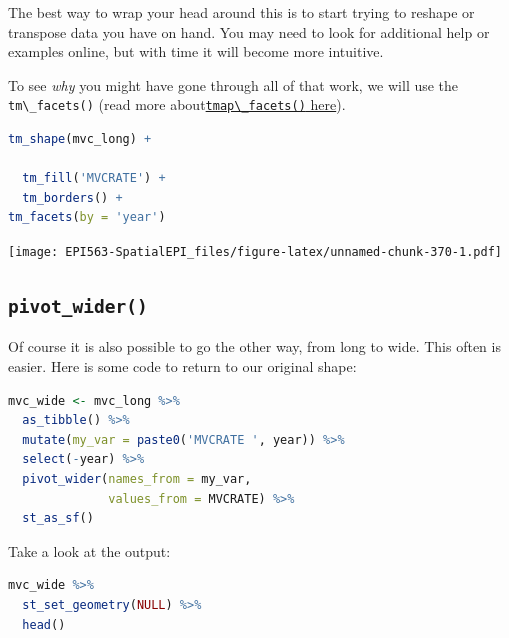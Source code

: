 \documentclass[
]{book}
\newcommand{\passthrough}[1]{#1}
\begin{document}
The best way to wrap your head around this is to start trying to reshape or transpose data you have on hand. You may need to look for additional help or examples online, but with time it will become more intuitive.

To see \emph{why} you might have gone through all of that work, we will use the \passthrough{\lstinline!tm\_facets()!} (read more about\protect\hyperlink{tmap-facet}{\passthrough{\lstinline!tmap\_facets()!} here}).

\begin{lstlisting}[language=R]
tm_shape(mvc_long) +
  
  tm_fill('MVCRATE') + 
  tm_borders() +
tm_facets(by = 'year')
\end{lstlisting}

\texttt{[image: EPI563-SpatialEPI\_files/figure-latex/unnamed-chunk-370-1.pdf]}

\hypertarget{pivot_wider}{%
\subsection{\texorpdfstring{\texttt{pivot\_wider()}}{pivot\_wider()}}\label{pivot_wider}}

Of course it is also possible to go the other way, from long to wide. This often is easier. Here is some code to return to our original shape:

\begin{lstlisting}[language=R]
mvc_wide <- mvc_long %>%
  as_tibble() %>%
  mutate(my_var = paste0('MVCRATE ', year)) %>%
  select(-year) %>%
  pivot_wider(names_from = my_var,
              values_from = MVCRATE) %>%
  st_as_sf()
\end{lstlisting}

Take a look at the output:

\begin{lstlisting}[language=R]
mvc_wide %>%
  st_set_geometry(NULL) %>%
  head()
\end{lstlisting}

 
  \providecommand{\huxb}[2]{\arrayrulecolor[RGB]{#1}\global\arrayrulewidth=#2pt}
  \providecommand{\huxvb}[2]{\color[RGB]{#1}\vrule width #2pt}
  \providecommand{\huxtpad}[1]{\rule{0pt}{#1}}
  \providecommand{\huxbpad}[1]{\rule[-#1]{0pt}{#1}}
\end{document}
